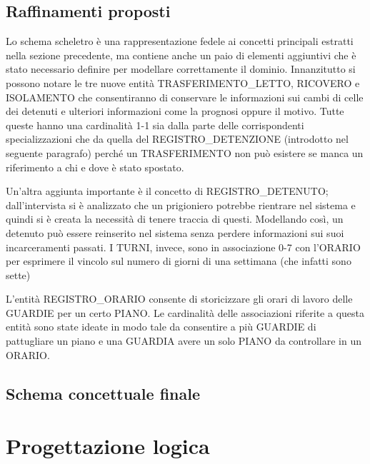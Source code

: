 \documentclass[a4paper,12pt]{report}
\begin{document}
\section{Raffinamenti proposti}
Lo schema scheletro è una rappresentazione fedele ai concetti principali estratti nella sezione precedente, ma contiene anche un paio di elementi aggiuntivi che è stato necessario definire per modellare correttamente il dominio.
%
Innanzitutto si possono notare le tre nuove entità TRASFERIMENTO\_LETTO, RICOVERO e ISOLAMENTO che consentiranno di conservare le informazioni sui cambi di celle dei detenuti e ulteriori informazioni come la prognosi oppure il motivo.
%
Tutte queste hanno una cardinalità 1-1 sia dalla parte delle corrispondenti specializzazioni che da quella del REGISTRO\_DETENZIONE (introdotto nel seguente paragrafo) perché un TRASFERIMENTO non può esistere se manca un riferimento a chi e dove è stato spostato.
%
\par
Un'altra aggiunta importante è il concetto di REGISTRO\_DETENUTO; dall'intervista si è analizzato che un prigioniero potrebbe rientrare nel sistema e quindi si è creata la necessità di tenere traccia di questi.
%
Modellando così, un detenuto può essere reinserito nel sistema senza perdere informazioni sui suoi incarceramenti passati.
%
I TURNI, invece, sono in associazione 0-7 con l'ORARIO per esprimere il vincolo sul numero di giorni di una settimana (che infatti sono sette)
%
\par
L'entità REGISTRO\_ORARIO consente di storicizzare gli orari di lavoro delle GUARDIE per un certo PIANO.
%
Le cardinalità delle associazioni riferite a questa entità sono state ideate in modo tale da consentire a più GUARDIE di pattugliare un piano e una GUARDIA avere un solo PIANO da controllare in un ORARIO.
\section{Schema concettuale finale}

\chapter{Progettazione logica}
\end{document}
